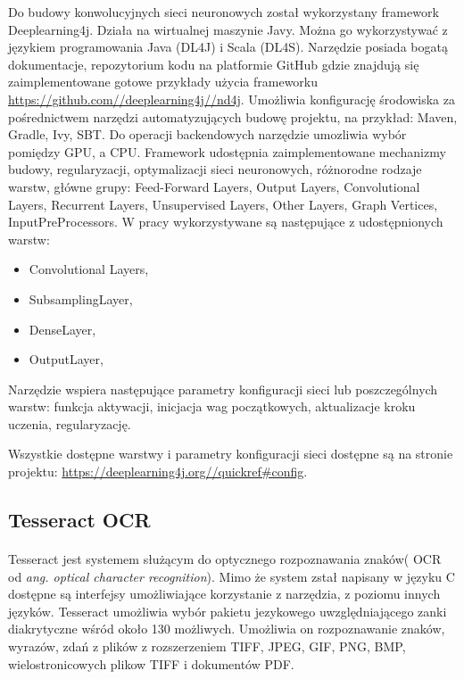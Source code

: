 \documentclass[a4paper,12pt]{article}
\begin{document}
        \par Do budowy konwolucyjnych sieci neuronowych został wykorzystany framework Deeplearning4j. Działa na wirtualnej maszynie Javy. Można go wykorzystywać z językiem programowania Java (DL4J) i Scala (DL4S). Narzędzie posiada bogatą dokumentacje, repozytorium kodu na platformie GitHub gdzie znajdują się zaimplementowane gotowe przykłady użycia frameworku \href{https://github.com//deeplearning4j//nd4j}{\url{https://github.com//deeplearning4j//nd4j}}. Umożliwia konfigurację środowiska za pośrednictwem narzędzi automatyzujących budowę projektu, na przykład: Maven, Gradle, Ivy, SBT. Do operacji backendowych narzędzie umozliwia wybór pomiędzy GPU, a CPU. Framework 
        udostępnia zaimplementowane mechanizmy budowy, regularyzacji, optymalizacji sieci neuronowych, różnorodne rodzaje warstw, główne grupy: Feed-Forward Layers, Output Layers, Convolutional Layers, Recurrent Layers,  Unsupervised Layers, Other Layers, Graph Vertices, InputPreProcessors. W pracy wykorzystywane są następujące z udostępnionych warstw: 
        \begin{itemize}
            \item Convolutional Layers,
            \item SubsamplingLayer,
            \item DenseLayer,
            \item OutputLayer,
        \end{itemize}
        \par Narzędzie wspiera następujące parametry konfiguracji sieci lub poszczególnych warstw: funkcja aktywacji, inicjacja wag początkowych, aktualizacje kroku uczenia, regularyzację. 
        \par Wszystkie dostępne warstwy i parametry konfiguracji sieci dostępne są na stronie projektu:
        \href{https://deeplearning4j.org//quickref\#config}{\url{https://deeplearning4j.org//quickref\#config}}.
        
	\subsection{Tesseract OCR}
	    \paragraph{} Tesseract jest systemem służącym do optycznego rozpoznawania znaków( OCR od \textit{ang. optical character recognition}). Mimo że system zstał napisany w języku C dostępne są interfejsy umożliwiające korzystanie z narzędzia, z poziomu innych języków. Tesseract umożliwia wybór pakietu jezykowego uwzględniającego zanki diakrytyczne wśród około 130 możliwych. Umożliwia on rozpoznawanie znaków, wyrazów, zdań z plików z rozszerzeniem TIFF, JPEG, GIF, PNG, BMP, wielostronicowych plikow TIFF i dokumentów PDF.
   
\end{document}
